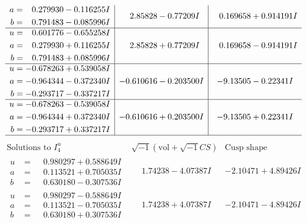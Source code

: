 \documentclass[1p]{elsarticle_modified}
\theoremstyle{definition}
\newcommand{\I}{\sqrt{-1}}
\begin{document}
$$\begin{array}{c|c|c}
\begin{aligned}
a &= \phantom{-}0.279930 - 0.116255 I \\
b &= \phantom{-}0.791483 - 0.085996 I\end{aligned}
 & \phantom{-}2.85828 - 0.77209 I & \phantom{-}0.169658 + 0.914191 I \\ \hline\begin{aligned}
u &= \phantom{-}0.601776 - 0.655258 I \\
a &= \phantom{-}0.279930 + 0.116255 I \\
b &= \phantom{-}0.791483 + 0.085996 I\end{aligned}
 & \phantom{-}2.85828 + 0.77209 I & \phantom{-}0.169658 - 0.914191 I \\ \hline\begin{aligned}
u &= -0.678263 + 0.539058 I \\
a &= -0.964344 - 0.372340 I \\
b &= -0.293717 - 0.337217 I\end{aligned}
 & -0.610616 - 0.203500 I & -9.13505 - 0.22341 I \\ \hline\begin{aligned}
u &= -0.678263 - 0.539058 I \\
a &= -0.964344 + 0.372340 I \\
b &= -0.293717 + 0.337217 I\end{aligned}
 & -0.610616 + 0.203500 I & -9.13505 + 0.22341 I\\
 \hline 
 \end{array}$$\newpage$$\begin{array}{c|c|c}  
\text{Solutions to }I^u_{4}& \I (\text{vol} + \sqrt{-1}CS) & \text{Cusp shape}\\
 \hline 
\begin{aligned}
u &= \phantom{-}0.980297 + 0.588649 I \\
a &= \phantom{-}0.113521 + 0.705035 I \\
b &= \phantom{-}0.630180 - 0.307536 I\end{aligned}
 & \phantom{-}1.74238 - 4.07387 I & -2.10471 + 4.89426 I \\ \hline\begin{aligned}
u &= \phantom{-}0.980297 - 0.588649 I \\
a &= \phantom{-}0.113521 - 0.705035 I \\
b &= \phantom{-}0.630180 + 0.307536 I\end{aligned}
 & \phantom{-}1.74238 + 4.07387 I & -2.10471 - 4.89426 I \\ \hline\begin{aligned}

\end{aligned}
\end{array}$$
\end{document}
